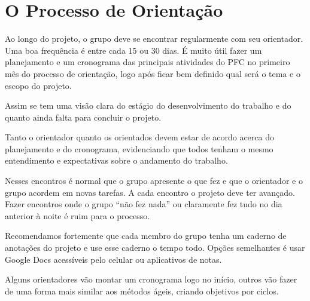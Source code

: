 

\chapter{O Processo de Orientação}

Ao longo do projeto, o grupo deve se encontrar regularmente com seu orientador. Uma boa frequência é entre cada 15 ou 30 dias. É muito útil fazer um planejamento e um cronograma das principais atividades do PFC no primeiro mês do processo de orientação, logo após ficar bem definido qual será o tema e o escopo do projeto.

Assim se tem uma visão clara do estágio do desenvolvimento do trabalho e do quanto ainda falta para concluir o projeto.

Tanto o orientador quanto os orientados devem estar de acordo acerca do planejamento e do cronograma, evidenciando que todos tenham o mesmo entendimento e expectativas sobre o andamento do trabalho.

Nesses encontros é normal que o grupo apresente o que fez e que o orientador e o grupo acordem em novas tarefas. A cada encontro o projeto deve ter avançado. Fazer encontros onde o grupo “não fez nada” ou claramente fez tudo no dia anterior à noite é ruim para o processo.

Recomendamos fortemente que cada membro do grupo tenha um caderno de anotações do projeto e use esse caderno o tempo todo. Opções semelhantes é usar Google Docs acessíveis pelo celular ou aplicativos de notas.

Alguns orientadores vão montar um cronograma logo no início, outros vão fazer de uma forma mais similar aos métodos ágeis, criando objetivos por ciclos.
